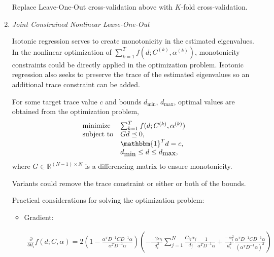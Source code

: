\documentclass{article}
\begin{document}
\begin{enumerate}
Replace Leave-One-Out cross-validation above with $K$-fold cross-validation.

\item \emph{Joint Constrained Nonlinear Leave-One-Out}

Isotonic regression serves to create monotonicity in the estimated eigenvalues.
In the nonlinear optimization of $\sum_{k=1}^T f(d; C^{(k)}, \alpha^{(k)})$,
monotonicity constraints could be directly applied in the optimization problem.
Isotonic regression also seeks to preserve the trace of the estimated
eigenvalues so an additional trace constraint can be added.

For some target trace value $c$ and bounds $d_{\mbox{min}}$, $d_{\mbox{max}}$,
optimal values are obtained from the optimization problem,
$$
\begin{array}{ll}
	\mbox{minimize}   & \sum_{k=1}^T f(d; C^{(k)}, \alpha^{(k)}) \\
	\mbox{subject to} & G d \preceq 0, \\
										& \mathbbm{1}^T d = c,\\
										& d_{\mbox{min}} \leq d \leq d_{\mbox{max}},
\end{array}
$$
where $G \in \mathbb{R}^{(N-1)\times N}$ is a differencing matrix to ensure
monotonicity.

Variants could remove the trace constraint or either or both of the bounds.


Practical considerations for solving the optimization problem:

\begin{itemize}
	\item Gradient: 

	\begin{align*}
	  \frac{\partial}{\partial d_i} f(d; C, \alpha)
	    = 2\left( 
	    	1 - \frac{ \alpha^T D^{-1} C D^{-1} \alpha }
	    					 { \alpha^T D^{-1} \alpha }
	    	\right)
	    	\left( 
	       - \frac{-2\alpha_i}{d_i^2}
	       	 \sum_{j=1}^N \frac{C_{ij}\alpha_j }{d_j}
	         \frac{ 1 }{ \alpha^T D^{-1} \alpha}
	      + \frac{ -\alpha_i^2 }{ d_i^2 }
	        \frac{ \alpha^T D^{-1} C D^{-1} \alpha }{ (\alpha^T D^{-1} \alpha)^2}
	    \right)
	\end{align*}
	

\end{itemize}
\end{enumerate}
\end{document}
